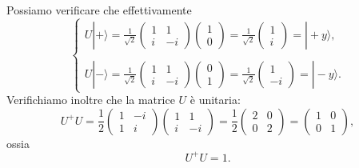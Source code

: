 Possiamo verificare che effettivamente
	\begin{equation}
		\begin{cases}
		U | + \rangle = \frac{1}{\sqrt{2}}
		\begin{pmatrix}
		1 & 1 \\
		i & -i
		\end{pmatrix}
		\begin{pmatrix}
		1\\
		0
		\end{pmatrix}=
		\frac{1}{\sqrt{2}}
		\begin{pmatrix}
		1\\
		i
		\end{pmatrix}=
		| +y \rangle , \\
		\\
		U | - \rangle= \frac{1}{\sqrt{2}}
		\begin{pmatrix}
		1 & 1 \\
		i & -i
		\end{pmatrix}
		\begin{pmatrix}
		0\\
		1
		\end{pmatrix}=
		\frac{1}{\sqrt{2}}
		\begin{pmatrix}
		1\\
		-i
		\end{pmatrix}=
		| -y \rangle . 
		\end{cases}
	\end{equation}
Verifichiamo inoltre che la matrice $U$ è unitaria:
	\begin{equation}
		U^+U = \frac{1}{2}
		\begin{pmatrix}
		1 & -i\\
		1 & i
		\end{pmatrix}
		\begin{pmatrix}
		1 & 1\\
		i & -i
		\end{pmatrix}=
		\frac{1}{2}
		\begin{pmatrix}
		2 & 0\\
		0 & 2
		\end{pmatrix}=
		\begin{pmatrix}
		1 & 0\\
		0 &1
		\end{pmatrix} , 
	\end{equation}
ossia
	\begin{equation}
		\boxed{
			U^+U=1 .
			} 
	\end{equation}

